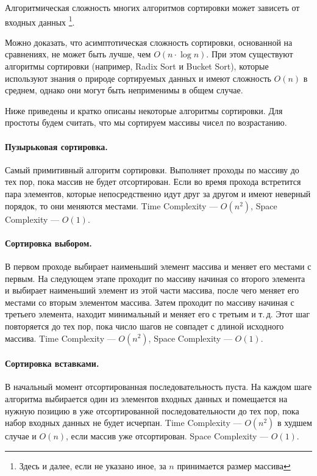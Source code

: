 Алгоритмическая сложность многих алгоритмов сортировки может зависеть от входных данных
\footnote{Здесь и далее, если не указано иное, за $n$ принимается размер массива}.

Можно доказать, что асимптотическая сложность сортировки, основанной на сравнениях, не может
быть лучше, чем $O(n\cdot \log n)$. При этом существуют алгоритмы сортировки (например, Radix Sort и Bucket Sort),
которые используют знания о природе сортируемых данных и имеют сложность $O(n)$ в среднем, однако они могут быть
неприменимы в общем случае.

Ниже приведены и кратко описаны некоторые алгоритмы сортировки. Для простоты будем считать,
что мы сортируем массивы чисел по возрастанию.

\paragraph{Пузырьковая сортировка.} Самый примитивный алгоритм сортировки. Выполняет проходы по массиву
до тех пор, пока массив не будет отсортирован. Если во время прохода встретится пара элементов, которые
непосредственно идут друг за другом и имеют неверный порядок, то они меняются местами. Time Complexity --- $O(n^2)$,
Space Complexity --- $O(1)$.

\paragraph{Сортировка выбором.} В первом проходе выбирает наименьший элемент массива и меняет его местами с первым.
На следующем этапе проходит по массиву начиная со второго элемента и выбирает наименьший элемент из этой части массива,
после чего меняет его местами со вторым элементом массива. Затем проходит по массиву начиная с третьего элемента, находит
минимальный и меняет его с третьим и т.\,д. Этот шаг повторяется до тех пор, пока число шагов не совпадет с длиной исходного массива.
Time Complexity --- $O(n^2)$, Space Complexity --- $O(1)$.

\paragraph{Сортировка вставками.} 
В начальный момент отсортированная последовательность пуста. На каждом шаге алгоритма выбирается один из
элементов входных данных и помещается на нужную позицию в уже отсортированной последовательности до тех пор,
пока набор входных данных не будет исчерпан.
Time Complexity --- $O(n^2)$ в худшем случае и $O(n)$, если массив уже отсортирован. Space Complexity --- $O(1)$.

